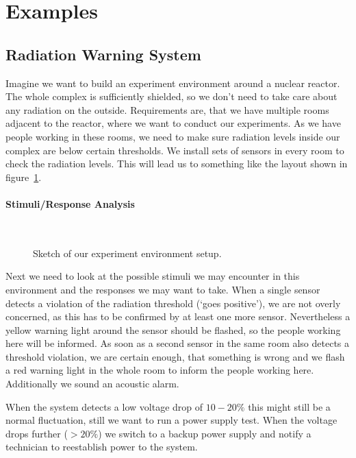 \documentclass[10pt,a4paper,titlepage,draft]{scrartcl} %
\begin{document}
\section{Examples}

\subsection{Radiation Warning System}
Imagine we want to build an experiment environment around a nuclear reactor.
The whole complex is sufficiently shielded, so we don't need to take care about any radiation on the outside.
Requirements are, that we have multiple rooms adjacent to the reactor, where we want to conduct our experiments.
As we have people working in these rooms, we need to make sure radiation levels inside our complex are below certain thresholds.
We install sets of sensors in every room to check the radiation levels.
This will lead us to something like the layout shown in figure~\ref{fig:radWarner}.

\paragraph{Stimuli/Response Analysis} \ \\
\begin{figure}[htbp]
\centering

\caption{Sketch of our experiment environment setup.}
\label{fig:radWarner}
\end{figure}
Next we need to look at the possible stimuli we may encounter in this environment and the responses we may want to take.
When a single sensor detects a violation of the radiation threshold (`goes positive'), we are not overly concerned, as this has to be confirmed by at least one more sensor.
Nevertheless a yellow warning light around the sensor should be flashed, so the people working here will be informed.
As soon as a second sensor in the same room also detects a threshold violation, we are certain enough, that something is wrong and we flash a red warning light in the whole room to inform the people working here.
Additionally we sound an acoustic alarm.

When the system detects a low voltage drop of $10-20\%$ this might still be a normal fluctuation, still we want to run a power supply test.
When the voltage drops further ($>20\%$) we switch to a backup power supply and notify a technician to reestablish power to the system.
\end{document}
